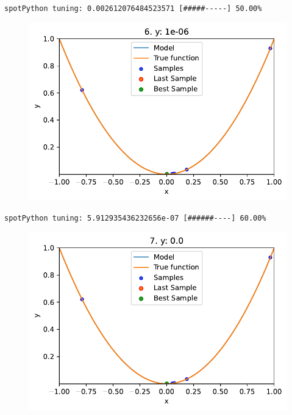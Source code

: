 \documentclass[
  letterpaper,
  DIV=11,
  numbers=noendperiod]{scrreprt}
\begin{document}
\begin{verbatim}
spotPython tuning: 0.002612076484523571 [#####-----] 50.00% 
\end{verbatim}

\begin{figure}[H]

{\centering \includegraphics{010_num_spot_sklearn_surrogate_files/figure-pdf/cell-25-output-6.pdf}

}

\end{figure}

\begin{verbatim}
spotPython tuning: 5.912935436232656e-07 [######----] 60.00% 
\end{verbatim}

\begin{figure}[H]

{\centering \includegraphics{010_num_spot_sklearn_surrogate_files/figure-pdf/cell-25-output-8.pdf}

}

\end{figure}
\end{document}
